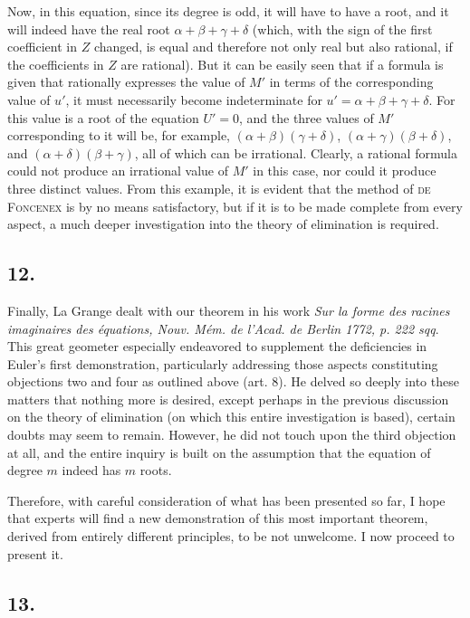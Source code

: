 \documentclass[12pt]{memoir}
\theoremstyle{plain}
\theoremstyle{remark}
\begin{document}
Now, in this equation, since its degree is odd, it will have to have a root, and it will indeed have the real root \(\alpha+\beta+\gamma+\delta\) (which, with the sign of the first coefficient in \(Z\) changed, is equal and therefore not only real but also rational, if the coefficients in \(Z\) are rational). But it can be easily seen that if a formula is given that rationally expresses the value of \(M'\) in terms of the corresponding value of \(u'\), it must necessarily become indeterminate for \(u' = \alpha + \beta + \gamma + \delta\). For this value is a root of the equation \(U' = 0\), and the three values of \(M'\) corresponding to it will be, for example, \((\alpha+\beta)(\gamma+\delta)\), \((\alpha+\gamma)(\beta+\delta)\), and \((\alpha+\delta)(\beta+\gamma)\), all of which can be irrational. Clearly, a rational formula could not produce an irrational value of \(M'\) in this case, nor could it produce three distinct values. From this example, it is evident that the method of \textsc{de Foncenex} is by no means satisfactory, but if it is to be made complete from every aspect, a much deeper investigation into the theory of elimination is required.

\subsection*{12.}

Finally, La Grange dealt with our theorem in his work \textit{Sur la forme des racines imaginaires des \'equations, Nouv. M\'em. de l'Acad. de Berlin 1772, p. 222 sqq}. This great geometer especially endeavored to supplement the deficiencies in Euler's first demonstration, particularly addressing those aspects constituting objections two and four as outlined above (art. 8). He delved so deeply into these matters that nothing more is desired, except perhaps in the previous discussion on the theory of elimination (on which this entire investigation is based), certain doubts may seem to remain. However, he did not touch upon the third objection at all, and the entire inquiry is built on the assumption that the equation of degree \(m\) indeed has \(m\) roots.

Therefore, with careful consideration of what has been presented so far, I hope that experts will find a new demonstration of this most important theorem, derived from entirely different principles, to be not unwelcome. I now proceed to present it.

\subsection*{13.}
\end{document}
